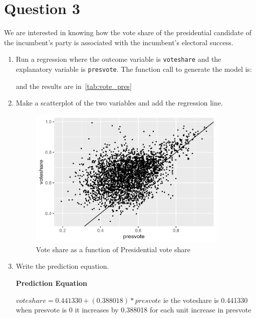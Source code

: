 \documentclass[12pt,letterpaper]{article}
\begin{document}
	\newpage	

\section*{Question 3}

\noindent We are interested in knowing how the vote share of the presidential candidate of the incumbent's party is associated with the incumbent's electoral success.
	\vspace{.25cm}
	\begin{enumerate}
		\item Run a regression where the outcome variable is \texttt{voteshare} and the explanatory variable is \texttt{presvote}.
    The function call to generate the model is:
  	
    and the results are in~\ref{tab:vote_pres}
    

		\item Make a scatterplot of the two variables and add the regression line. 
	\begin{figure}
		  \includegraphics[width=0.9\textwidth]{Graphics/vote_pres.png}
		  \caption{Vote share as a function of Presidential vote share}
		  \label{fig:vote_pres}
	\end{figure}

		\item Write the prediction equation.
		
    \textbf{Prediction Equation} 

     $voteshare = 0.441330 + (0.388018) * presvote$
     ie the voteshare is 0.441330 when presvote is 0
        it increases by 0.388018 for each unit increase in presvote
	\end{enumerate}
	
\end{document}
